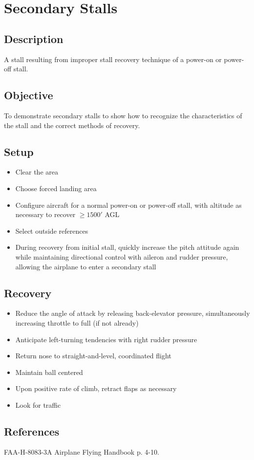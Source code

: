 \section{Secondary Stalls}

\subsection{Description}

A stall resulting from improper stall recovery technique of a power-on or
power-off stall.

\subsection{Objective}

To demonstrate secondary stalls to show how to recognize the characteristics of
the stall and the correct methods of recovery.

\subsection{Setup}

\begin{itemize}
  \item Clear the area
  \item Choose forced landing area
  \item Configure aircraft for a normal power-on or power-off stall, with
    altitude as necessary to recover $\geq 1500'$ AGL
  \item Select outside references
  \item During recovery from initial stall, quickly increase the pitch attitude
    again while maintaining directional control with aileron and rudder
    pressure, allowing the airplane to enter a secondary stall
\end{itemize}

\subsection{Recovery}

\begin{itemize}
  \item Reduce the angle of attack by releasing back-elevator pressure,
    simultaneously increasing throttle to full (if not already)
  \item Anticipate left-turning tendencies with right rudder pressure
  \item Return nose to straight-and-level, coordinated flight 
  \item Maintain ball centered
  \item Upon positive rate of climb, retract flaps as necessary 
  \item Look for traffic
\end{itemize}

\subsection{References}

FAA-H-8083-3A Airplane Flying Handbook p. 4-10.

